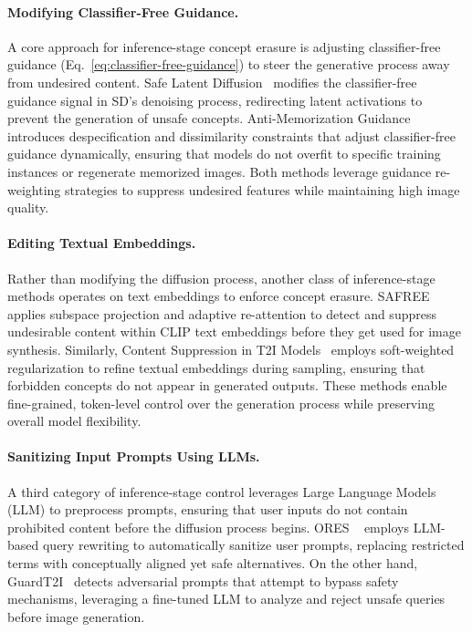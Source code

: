 \paragraph{Modifying Classifier-Free Guidance.}  
A core approach for inference-stage concept erasure is adjusting classifier-free guidance (Eq.~\eqref{eq:classifier-free-guidance}) to steer the generative process away from undesired content. Safe Latent Diffusion~\cite{sld} modifies the classifier-free guidance signal in SD’s denoising process, redirecting latent activations to prevent the generation of unsafe concepts. Anti-Memorization Guidance~\cite{Chen2024TowardsMD} introduces despecification and dissimilarity constraints that adjust classifier-free guidance dynamically, ensuring that models do not overfit to specific training instances or regenerate memorized images. Both methods leverage guidance re-weighting strategies to suppress undesired features while maintaining high image quality.

\paragraph{Editing Textual Embeddings.}  
Rather than modifying the diffusion process, another class of inference-stage methods operates on text embeddings to enforce concept erasure. SAFREE~\cite{safree} applies subspace projection and adaptive re-attention to detect and suppress undesirable content within CLIP text embeddings before they get used for image synthesis. Similarly, Content Suppression in T2I Models~\cite{Li2024GetWY} employs soft-weighted regularization to refine textual embeddings during sampling, ensuring that forbidden concepts do not appear in generated outputs. These methods enable fine-grained, token-level control over the generation process while preserving overall model flexibility.

\paragraph{Sanitizing Input Prompts Using LLMs.}  
A third category of inference-stage control leverages Large Language Models (LLM) to preprocess prompts, ensuring that user inputs do not contain prohibited content before the diffusion process begins. ORES ~\cite{ores} employs LLM-based query rewriting to automatically sanitize user prompts, replacing restricted terms with conceptually aligned yet safe alternatives. On the other hand, GuardT2I~\cite{Yang2024GuardT2IDT} detects adversarial prompts that attempt to bypass safety mechanisms, leveraging a fine-tuned LLM to analyze and reject unsafe queries before image generation. 

